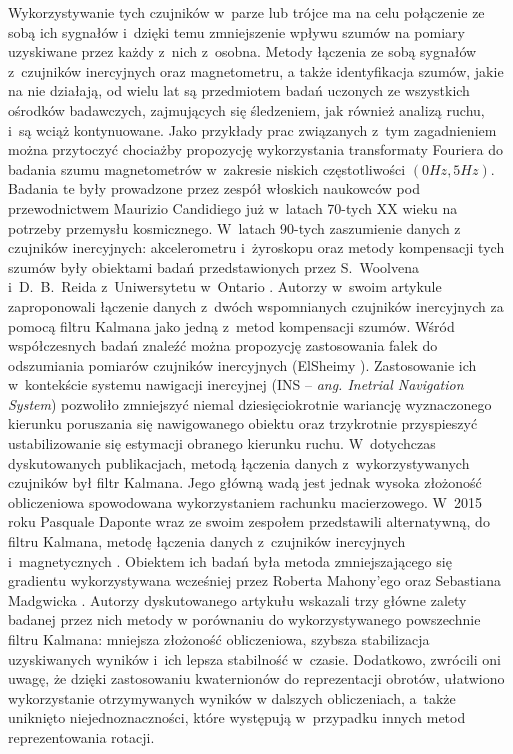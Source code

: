 Wykorzystywanie tych czujników w~parze lub trójce ma na celu połączenie ze sobą ich sygnałów i~dzięki temu zmniejszenie wpływu szumów na pomiary uzyskiwane przez każdy z~nich z~osobna. Metody łączenia ze sobą sygnałów z~czujników inercyjnych oraz magnetometru, a także identyfikacja szumów, jakie na nie działają, od wielu lat są przedmiotem badań uczonych ze wszystkich ośrodków badawczych, zajmujących się śledzeniem, jak również analizą ruchu, i~są wciąż kontynuowane. Jako przykłady prac związanych z~tym zagadnieniem można przytoczyć chociażby propozycję wykorzystania transformaty Fouriera do badania szumu magnetometrów w~zakresie niskich częstotliwości $(0Hz, 5Hz)$\cite{Candidi1974}. Badania te były prowadzone przez zespół włoskich naukowców pod przewodnictwem Maurizio Candidiego już w~latach 70-tych XX wieku na potrzeby przemysłu kosmicznego. W~latach 90-tych zaszumienie danych z czujników inercyjnych: akcelerometru i~żyroskopu oraz metody kompensacji tych szumów były obiektami badań przedstawionych przez S.~Woolvena i~D.~B.~Reida z~Uniwersytetu w~Ontario \cite{Woolven1994}. Autorzy w~swoim artykule zaproponowali łączenie danych z~dwóch wspomnianych czujników inercyjnych za pomocą filtru Kalmana jako jedną z~metod kompensacji szumów. Wśród współczesnych badań znaleźć można propozycję zastosowania falek do odszumiania pomiarów czujników inercyjnych (ElSheimy \cite{ElSheimy2004}). Zastosowanie ich w~kontekście systemu nawigacji inercyjnej (INS -- \emph{ang. Inetrial Navigation System}) pozwoliło zmniejszyć niemal dziesięciokrotnie wariancję wyznaczonego kierunku poruszania się nawigowanego obiektu oraz trzykrotnie przyspieszyć ustabilizowanie się estymacji obranego kierunku ruchu. W~dotychczas dyskutowanych publikacjach, metodą łączenia danych z~wykorzystywanych czujników był filtr Kalmana. Jego główną wadą jest jednak wysoka złożoność obliczeniowa spowodowana wykorzystaniem rachunku macierzowego. W~2015 roku Pasquale Daponte wraz ze swoim zespołem przedstawili alternatywną, do filtru Kalmana, metodę łączenia danych z~czujników inercyjnych i~magnetycznych \cite{Daponte2015}. Obiektem ich badań była metoda zmniejszającego się gradientu wykorzystywana wcześniej przez Roberta Mahony'ego \cite{Mahony2005a} oraz Sebastiana Madgwicka \cite{Madgwick2011}. Autorzy dyskutowanego artykułu wskazali trzy główne zalety badanej przez nich metody w porównaniu do wykorzystywanego powszechnie filtru Kalmana: mniejsza złożoność obliczeniowa, szybsza stabilizacja uzyskiwanych wyników i~ich lepsza stabilność w~czasie. Dodatkowo, zwrócili oni uwagę, że dzięki zastosowaniu kwaternionów do reprezentacji obrotów, ułatwiono wykorzystanie otrzymywanych wyników w dalszych obliczeniach, a~także uniknięto niejednoznaczności, które występują w~przypadku innych metod reprezentowania rotacji.

